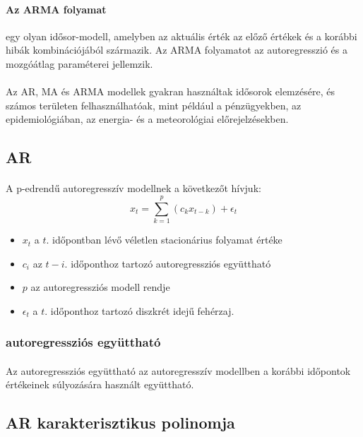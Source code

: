 \documentclass[11pt,a4paper]{article}
\begin{document}
				\paragraph{Az ARMA folyamat}
					egy olyan idősor-modell, amelyben az aktuális érték az előző értékek és a korábbi hibák kombinációjából származik. Az ARMA folyamatot az autoregresszió és a mozgóátlag paraméterei jellemzik.
				\paragraph{}
					Az AR, MA és ARMA modellek gyakran használtak idősorok elemzésére, és számos területen felhasználhatóak, mint például a pénzügyekben, az epidemiológiában, az energia- és a meteorológiai előrejelzésekben.
				\subsection{AR}
					\paragraph{}
						A p-edrendű autoregresszív modellnek a következőt hívjuk:
						$$x_t = \sum_{k=1}^{p}(c_k x_{t-k}) + \epsilon_t$$
						\begin{itemize}
							\item $x_t$ a $t.$ időpontban lévő véletlen stacionárius folyamat értéke
							\item $c_i$ az $t-i.$ időponthoz tartozó autoregressziós együttható
							\item $p$ az autoregressziós modell rendje
							\item $\epsilon_t$ a $t.$ időponthoz tartozó diszkrét idejű fehérzaj.
						\end{itemize}
					\subsubsection{autoregressziós együttható}
						\paragraph{}
							Az autoregressziós együttható az autoregresszív modellben a korábbi időpontok értékeinek súlyozására használt együttható.
					\subsection{AR karakterisztikus polinomja}
\end{document}
